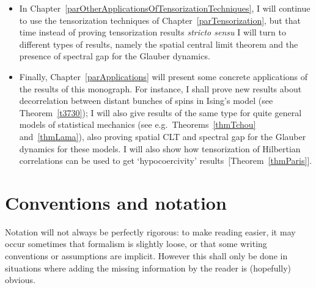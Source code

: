 \begin{itemize}
in it I will handle tensorization of Hilbertian decorrelations.
This chapter begins with a refined version of the concept of correlation,
called ``subjective correlation'', which is necessary to write the subsequent tensorization results.
Then I shall state and prove my three main tensorization theorems:
Theorem~\ref{thm5750} (`$N$~against~$1$' theorem)
bounds the correlation between
a `simple' and a `vector' variable;
Theorem~\ref{thm6413} (`$N$~against~$M$' theorem)
deals with correlation between two vector variables,
and Theorem~\ref{thm0119} (`$\ZZ$~against~$\ZZ$' theorem)
refines the previous one in the case where certain symmetries are present.
%
Then, I will discuss some refinement and optimality statements
about these theorems; in \S~\ref{par3lines},
I will also present a geometric corollary of tensorization results
which underlines quite well the Hilbertian aspect of maximal correlations.
%
\item In Chapter~\ref{parOtherApplicationsOfTensorizationTechniques},
I will continue to use the tensorization techniques of Chapter~\ref{parTensorization},
but that time instead of proving tensorization results \emph{stricto sensu}
I will turn to different types of results, namely the spatial central limit theorem
and the presence of spectral gap for the Glauber dynamics.
%
\item Finally, Chapter~\ref{parApplications} will present some concrete applications
of the results of this monograph. For instance, I shall prove new results about decorrelation
between distant bunches of spins in Ising's model (see Theorem~\ref{t3730});
I will also give results of the same type for quite general models of statistical mechanics (see e.g.\ Theorems~\ref{thmTchou} and~\ref{thmLama}),
also proving spatial CLT and spectral gap for the Glauber dynamics for these models.
I will also show how tensorization of Hilbertian correlations can be used
to get `hypocoercivity' results~[Theorem~\ref{thmParis}].
\end{itemize}


\section*{Conventions and notation}

Notation will not always be perfectly rigorous:
to make reading easier, it may occur sometimes that formalism is slightly loose,
or that some writing conventions or assumptions are implicit.
However this shall only be done in situations
where adding the missing information by the reader is (hopefully) obvious.

